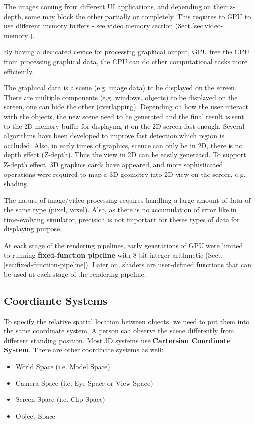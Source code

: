 The images coming from different UI applications, and depending on their
z-depth, some may block the other partially or completely. This requires to GPU
to use different memory buffers - see video memory section
(Sect.\ref{sec:video-memory}).

By having a dedicated device for processing graphical output,  GPU free the CPU
from processing graphical data, the CPU can do other computational tasks more
efficiently.

\begin{mdframed}

The graphical data is a scene (e.g. image data) to be displayed on the screen.
There are multiple components (e.g. windows, objects) to be displayed on the
screen, one can hide the other (overlapping). Depending on how the user interact
with the objects, the new scene need to be generated and the final result is
sent to the 2D memory buffer for displaying it on the 2D screen fast enough.
Several algorithms have been developed to improve fast detection which region
is occluded. Also, in early times of
graphics, scence can only be in 2D, there is no depth effect (Z-depth). Thus the view in 2D can
be easily generated. To support Z-depth effect, 3D graphics cards have appeared,
and more sophisticated operations were required to map a 3D geometry into 2D
view on the screen, e.g. shading.


\end{mdframed}

The nature of image/video processing requires handling a large amount of data of
the same type (pixel, voxel). Also, as there is no accumulation of error like in
time-evolving simulator,  precision is not important for theses types of data
for displaying purpose.

At each stage of the rendering pipelines, early generations of GPU were limited
to running {\bf fixed-function pipeline} with 8-bit integer arithmetic
(Sect.\ref{sec:fixed-function-pipeline}). Later on, shaders are user-defined
functions that can be used at each stage of the rendering pipeline.



\subsection{Coordiante Systems}

To specify the relative spatial location between objects, we need to put them
into the same coordinate system. A person can observe the scene differently from
different standing position. Most 3D systems use {\bf Cartersian Coordinate
System}. There are other coordinate systems as well:
\begin{itemize}
  \item World Space (i.e. Model Space)
  \item Camera Space (i.e. Eye Space or View Space)
  \item Screen Space (i.e. Clip Space)
  \item Object Space
\end{itemize}

